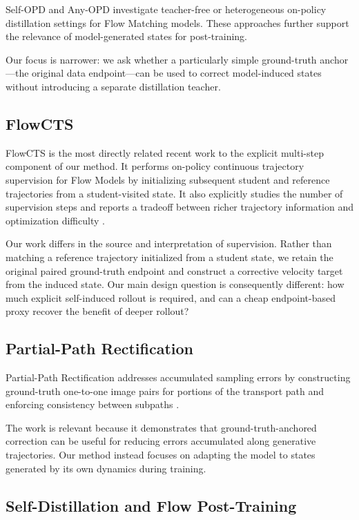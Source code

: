 \documentclass[11pt]{article}
\begin{document}
Self-OPD and Any-OPD investigate teacher-free or heterogeneous on-policy
distillation settings for Flow Matching models. These approaches further
support the relevance of model-generated states for post-training.

Our focus is narrower: we ask whether a particularly simple ground-truth
anchor---the original data endpoint---can be used to correct model-induced
states without introducing a separate distillation teacher.

\subsection{FlowCTS}

FlowCTS is the most directly related recent work to the explicit multi-step
component of our method. It performs on-policy continuous trajectory
supervision for Flow Models by initializing subsequent student and reference
trajectories from a student-visited state. It also explicitly studies the
number of supervision steps and reports a tradeoff between richer trajectory
information and optimization difficulty \cite{ye2026flowcts}.

Our work differs in the source and interpretation of supervision. Rather than
matching a reference trajectory initialized from a student state, we retain
the original paired ground-truth endpoint and construct a corrective velocity
target from the induced state. Our main design question is consequently
different: how much explicit self-induced rollout is required, and can a cheap
endpoint-based proxy recover the benefit of deeper rollout?

\subsection{Partial-Path Rectification}

Partial-Path Rectification addresses accumulated sampling errors by
constructing ground-truth one-to-one image pairs for portions of the transport
path and enforcing consistency between subpaths \cite{zhang2026partial}.

The work is relevant because it demonstrates that ground-truth-anchored
correction can be useful for reducing errors accumulated along generative
trajectories. Our method instead focuses on adapting the model to states
generated by its own dynamics during training.

\subsection{Self-Distillation and Flow Post-Training}
\end{document}
